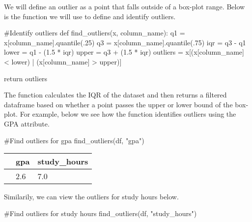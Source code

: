 \documentclass[
  letterpaper,
  DIV=11,
  numbers=noendperiod]{scrreprt}
\newenvironment{Shaded}{\begin{snugshade}}{\end{snugshade}}
\newcommand{\CommentTok}[1]{\textcolor[rgb]{0.37,0.37,0.37}{#1}}
\newcommand{\ControlFlowTok}[1]{\textcolor[rgb]{0.00,0.23,0.31}{#1}}
\newcommand{\FloatTok}[1]{\textcolor[rgb]{0.68,0.00,0.00}{#1}}
\newcommand{\KeywordTok}[1]{\textcolor[rgb]{0.00,0.23,0.31}{#1}}
\newcommand{\NormalTok}[1]{\textcolor[rgb]{0.00,0.23,0.31}{#1}}
\newcommand{\OperatorTok}[1]{\textcolor[rgb]{0.37,0.37,0.37}{#1}}
\newcommand{\StringTok}[1]{\textcolor[rgb]{0.13,0.47,0.30}{#1}}
\begin{document}
We will define an outlier as a point that falls outside of a box-plot
range. Below is the function we will use to define and identify
outliers.

\begin{Shaded}
\begin{Highlighting}[]
\CommentTok{\#Identify outliers}
\KeywordTok{def}\NormalTok{ find\_outliers(x, column\_name):}
\NormalTok{    q1 }\OperatorTok{=}\NormalTok{ x[column\_name].quantile(}\FloatTok{.25}\NormalTok{)}
\NormalTok{    q3 }\OperatorTok{=}\NormalTok{ x[column\_name].quantile(}\FloatTok{.75}\NormalTok{)}
\NormalTok{    iqr }\OperatorTok{=}\NormalTok{ q3 }\OperatorTok{{-}}\NormalTok{ q1}
\NormalTok{    lower }\OperatorTok{=}\NormalTok{ q1 }\OperatorTok{{-}}\NormalTok{ (}\FloatTok{1.5} \OperatorTok{*}\NormalTok{ iqr)}
\NormalTok{    upper }\OperatorTok{=}\NormalTok{ q3 }\OperatorTok{+}\NormalTok{ (}\FloatTok{1.5} \OperatorTok{*}\NormalTok{ iqr)}
\NormalTok{    outliers }\OperatorTok{=}\NormalTok{ x[(x[column\_name] }\OperatorTok{\textless{}}\NormalTok{ lower) }\OperatorTok{|}\NormalTok{ (x[column\_name] }\OperatorTok{\textgreater{}}\NormalTok{ upper)]}
    
    \ControlFlowTok{return}\NormalTok{ outliers}
    
\end{Highlighting}
\end{Shaded}

The function calculates the IQR of the dataset and then returns a
filtered dataframe based on whether a point passes the upper or lower
bound of the box-plot. For example, below we see how the function
identifies outliers using the GPA attribute.

\begin{Shaded}
\begin{Highlighting}[]
\CommentTok{\#Find outliers for gpa}
\NormalTok{find\_outliers(df, }\StringTok{"gpa"}\NormalTok{)}
\end{Highlighting}
\end{Shaded}

\begin{longtable}[]{@{}lll@{}}
\toprule\noalign{}
& gpa & study\_hours \\
\midrule\noalign{}
\endhead
\bottomrule\noalign{}
\endlastfoot
108 & 2.6 & 7.0 \\
\end{longtable}

Similarily, we can view the outliers for study hours below.

\begin{Shaded}
\begin{Highlighting}[]
\CommentTok{\#Find outliers for study hours}
\NormalTok{find\_outliers(df, }\StringTok{"study\_hours"}\NormalTok{)}
\end{Highlighting}
\end{Shaded}
\end{document}
